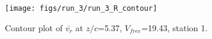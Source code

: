 \begin{figure}[H]
\centering
\texttt{[image: figs/run\_3/run\_3\_R\_contour]}
\caption{Contour plot of $\overline{v_{r}}$ at $z/c$=5.37, $V_{free}$=19.43, station 1.}
\label{fig:run_3_R_contour}
\end{figure}


